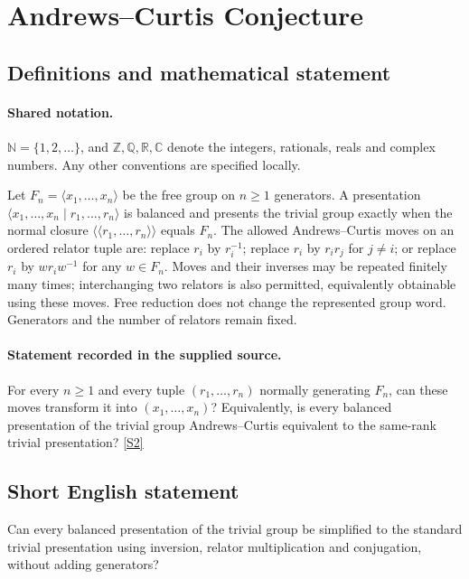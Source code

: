 \documentclass[11pt]{article}
\newcommand{\sref}[2]{\hyperlink{source:#1:#2}{[S#2]}}
\begin{document}
\section{Andrews–Curtis Conjecture}\label{statement}

\subsection{Definitions and mathematical statement}

\paragraph{Shared notation.}$\mathbb N=\{1,2,\ldots\}$, and $\mathbb Z,\mathbb Q,\mathbb R,\mathbb C$ denote the integers, rationals, reals and complex numbers. Any other conventions are specified locally.


Let $F_n=\langle x_1,\ldots,x_n\rangle$ be the free group on $n\geq1$ generators. A presentation $\langle x_1,\ldots,x_n\mid r_1,\ldots,r_n\rangle$ is balanced and presents the trivial group exactly when the normal closure $\langle\!\langle r_1,\ldots,r_n\rangle\!\rangle$ equals $F_n$. The allowed Andrews--Curtis moves on an ordered relator tuple are: replace $r_i$ by $r_i^{-1}$; replace $r_i$ by $r_ir_j$ for $j\ne i$; or replace $r_i$ by $wr_iw^{-1}$ for any $w\in F_n$. Moves and their inverses may be repeated finitely many times; interchanging two relators is also permitted, equivalently obtainable using these moves. Free reduction does not change the represented group word. Generators and the number of relators remain fixed.
\paragraph{Statement recorded in the supplied source.}
For every $n\geq1$ and every tuple $(r_1,\ldots,r_n)$ normally generating $F_n$, can these moves transform it into $(x_1,\ldots,x_n)$? Equivalently, is every balanced presentation of the trivial group Andrews--Curtis equivalent to the same-rank trivial presentation? \sref{statement}{2}

\subsection{Short English statement}
Can every balanced presentation of the trivial group be simplified to the standard trivial presentation using inversion, relator multiplication and conjugation, without adding generators?
\end{document}
